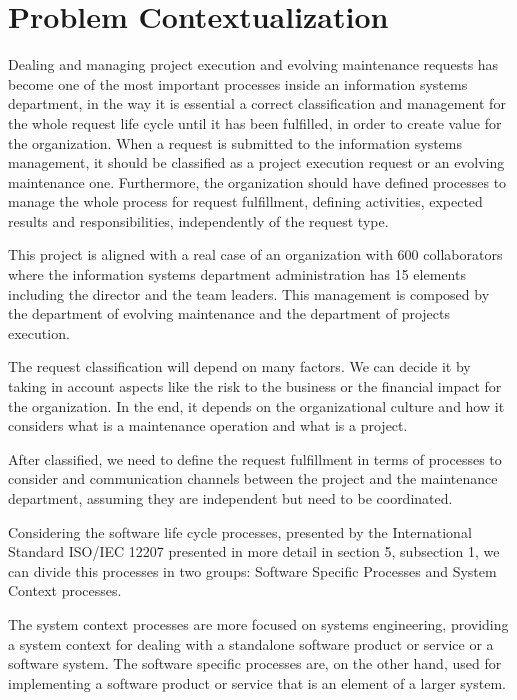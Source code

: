 
% 
% 

\section{Problem Contextualization}


Dealing and managing project execution and evolving maintenance requests has become one of the most important processes inside an information systems department, in the way it is essential a correct classification and management for the whole request life cycle until it has been fulfilled, in order to create value for the organization.
When a request is submitted to the information systems management, it should be classified as a project execution request or an evolving maintenance one. Furthermore, the organization should have defined processes to manage the whole process for request fulfillment, defining activities, expected results and responsibilities, independently of the request type.\par
This project is aligned with a real case of an organization with 600 collaborators where the information systems department administration has 15 elements including the director and the team leaders. This management is composed by the department of evolving maintenance and the department of projects execution.\par
The request classification will depend on many factors. We can decide it by taking in account aspects like the risk to the business or the financial impact for the organization. In the end, it depends on the organizational culture and how it considers what is a maintenance operation and what is a project.\par
After classified, we need to define the request fulfillment in terms of processes to consider and communication channels between the project and the maintenance department, assuming they are independent but need to be coordinated.\par
Considering the software life cycle processes, presented by the International Standard ISO/IEC 12207\cite{ISO12207} presented in more detail in section 5, subsection 1, we can divide this processes in two groups: Software Specific Processes and System Context processes.\par
The system context processes are more focused on systems engineering, providing a system context for dealing with a standalone software product or service or a software system. The software specific processes are, on the other hand, used for implementing a software product or service that is an element of a larger system. \par 

